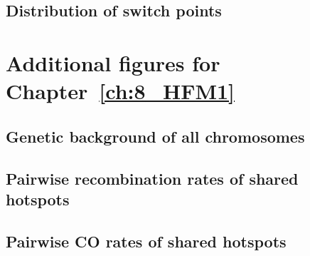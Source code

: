 \subsection{Distribution of switch points}
\section{Additional figures for Chapter~\ref{ch:8_HFM1}}
\subsection{Genetic background of all chromosomes}
\subsection{Pairwise recombination rates of shared hotspots}
\subsection{Pairwise CO rates of shared hotspots}





